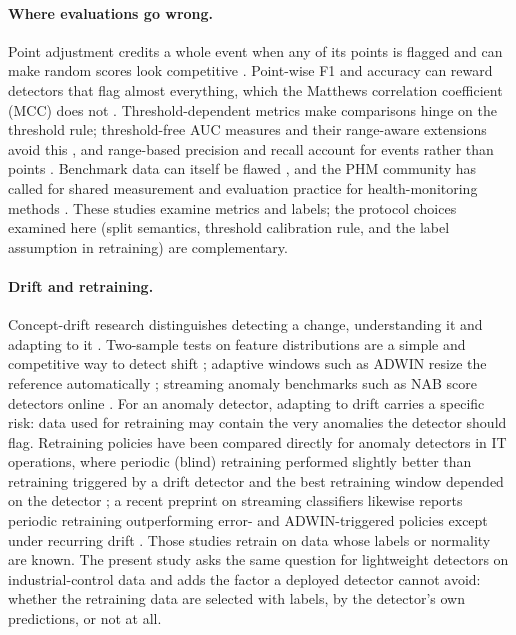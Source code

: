 \documentclass[11pt]{article}
\begin{document}
\paragraph{Where evaluations go wrong.} Point adjustment credits a whole event
when any of its points is flagged and can make random scores look competitive
\citep{kim2022}. Point-wise F1 and accuracy can reward detectors that flag
almost everything, which the Matthews correlation coefficient (MCC) does not
\citep{chicco2020,garg2021}. Threshold-dependent metrics make comparisons hinge
on the threshold rule; threshold-free AUC measures and their range-aware
extensions avoid this \citep{paparrizos2022,liu2024}, and range-based
precision and recall account for events rather than points \citep{tatbul2018}.
Benchmark data can itself be flawed \citep{wu2023}, and the PHM community has
called for shared measurement and evaluation practice for health-monitoring methods
\citep{weiss2021}. These studies examine metrics
and labels; the protocol choices examined here (split semantics, threshold
calibration rule, and the label assumption in retraining) are complementary.

\paragraph{Drift and retraining.} Concept-drift research distinguishes
detecting a change, understanding it and adapting to it \citep{gama2014,lu2018}.
Two-sample tests on feature distributions are a simple and competitive way to
detect shift \citep{rabanser2019}; adaptive windows such as ADWIN resize the
reference automatically \citep{bifet2007}; streaming anomaly benchmarks such as
NAB score detectors online \citep{ahmad2017}. For an anomaly detector, adapting
to drift carries a specific risk: data used for retraining may contain the very
anomalies the detector should flag. Retraining policies have been compared
directly for anomaly detectors in IT operations, where periodic (blind)
retraining performed slightly better than retraining triggered by a drift
detector and the best retraining window depended on the detector
\citep{poenaru2024}; a recent preprint on streaming classifiers likewise reports
periodic retraining outperforming error- and ADWIN-triggered policies except under
recurring drift \citep{dasari2026}. Those studies retrain on data whose labels or
normality are known. The present study asks the same question for lightweight
detectors on industrial-control data and adds the factor a deployed detector cannot
avoid: whether the retraining data are selected with labels, by the detector's own
predictions, or not at all.
\end{document}
